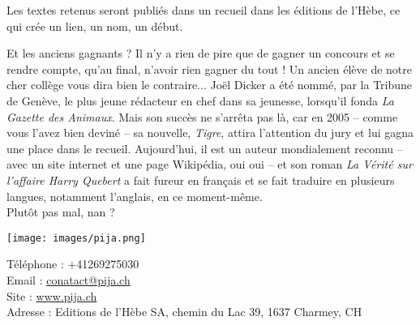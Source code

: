 \begin{article}
\begin{spacing}{.9}
Les textes retenus seront publiés dans un recueil dans les éditions de l'Hèbe, ce qui crée un lien, un nom, un début.

Et les anciens gagnants ? Il n'y a rien de pire que de gagner un concours et se rendre compte, qu'au final, n'avoir rien gagner du tout ! Un ancien élève de notre cher collège vous dira bien le contraire... Joël Dicker a été nommé, par la Tribune de Genève, le plus jeune rédacteur en chef dans sa jeunesse, lorsqu'il fonda \textit{La Gazette des Animaux}. Mais son succès ne s'arrêta pas là, car en 2005 – comme vous l'avez bien deviné – sa nouvelle, \textit{Tigre}, attira l'attention du jury et lui gagna une place dans le recueil. Aujourd'hui, il est un auteur mondialement reconnu – avec un site internet et une page Wikipédia, oui oui – et son roman \textit{La Vérité sur l'affaire Harry Quebert} a fait fureur en français et se fait traduire en plusieurs langues, notamment l'anglais, en ce moment-même.\\
Plutôt pas mal, nan ?

\vspace*{-1mm}\texttt{[image: images/pija.png]}\vspace*{-1mm}

Téléphone : +41269275030\\
Email : \url{conatact@pija.ch}\\
Site : \url{www.pija.ch}\\
Adresse : Editions de l'Hèbe SA, chemin du Lac 39, 1637 Charmey, CH
\end{spacing}
\end{article}




\newpage




